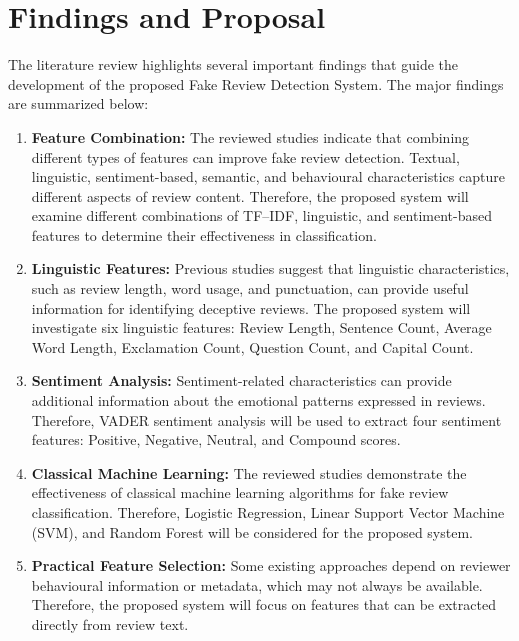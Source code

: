 \documentclass[12pt,a4paper]{report}
\begin{document}
\section{Findings and Proposal}

The literature review highlights several important findings
that guide the development of the proposed Fake Review
Detection System. The major findings are summarized below:

\begin{enumerate}

\item \textbf{Feature Combination:}
The reviewed studies indicate that combining different
types of features can improve fake review detection.
Textual, linguistic, sentiment-based, semantic, and
behavioural characteristics capture different aspects
of review content. Therefore, the proposed system will
examine different combinations of TF--IDF, linguistic,
and sentiment-based features to determine their
effectiveness in classification.

\item \textbf{Linguistic Features:}
Previous studies suggest that linguistic characteristics,
such as review length, word usage, and punctuation,
can provide useful information for identifying deceptive
reviews. The proposed system will investigate six
linguistic features: Review Length, Sentence Count,
Average Word Length, Exclamation Count, Question Count,
and Capital Count.

\item \textbf{Sentiment Analysis:}
Sentiment-related characteristics can provide additional
information about the emotional patterns expressed in
reviews. Therefore, VADER sentiment analysis will be
used to extract four sentiment features: Positive,
Negative, Neutral, and Compound scores.

\item \textbf{Classical Machine Learning:}
The reviewed studies demonstrate the effectiveness
of classical machine learning algorithms for fake
review classification. Therefore, Logistic Regression,
Linear Support Vector Machine (SVM), and Random Forest
will be considered for the proposed system.

\item \textbf{Practical Feature Selection:}
Some existing approaches depend on reviewer behavioural
information or metadata, which may not always be
available. Therefore, the proposed system will focus
on features that can be extracted directly from
review text.

\end{enumerate}
\end{document}

